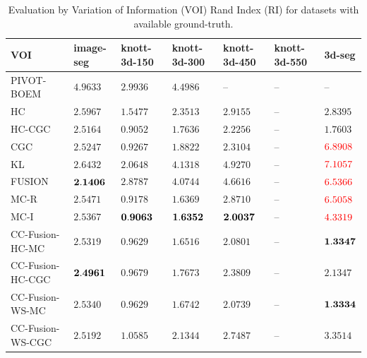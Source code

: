 \documentclass[10pt,twocolumn,letterpaper]{article}
\theoremstyle{definition}
\newcommand{\rd}{\color{red}}
\begin{document}
\begin{table}[t]
   \tiny
   \centering
   \caption{Evaluation by Variation of Information (VOI) Rand Index (RI) for datasets with available ground-truth.}
   \label{tab:eval}
   \begin{tabular}{lllllll}
      \toprule
         VOI              &  image-seg   & knott-3d-150 & knott-3d-300   & knott-3d-450 & knott-3d-550 &3d-seg\\
      \midrule 
         PIVOT-BOEM       &\rd$ 4.9633$  &\rd $ 2.9936$ &\rd $ 4.4986$   &      --      &    --        &  --\\ 
         HC               &   $ 2.5967$  &    $ 1.5477$ &    $ 2.3513$   &    $ 2.9155$ &    --        & $       2.8395$\\
         HC-CGC           &   $ 2.5164$  &    $ 0.9052$ &    $ 1.7636$   &    $ 2.2256$ &    --        & $       1.7603$ \\
         CGC              &   $ 2.5247$  &    $ 0.9267$ &    $ 1.8822$   &    $ 2.3104$ &    --        & $\rd    6.8908$ \\
         KL               &   $ 2.6432$  &\rd $ 2.0648$ &\rd $ 4.1318$   &\rd $ 4.9270$ &    --        & $\rd    7.1057$\\
         FUSION           &$\bf 2.1406$  &\rd $ 2.8787$ &\rd $ 4.0744$   &\rd $ 4.6616$ &    --        & $\rd    6.5366$ \\
         MC-R             &   $ 2.5471$  &    $ 0.9178$ &    $ 1.6369$   &    $ 2.8710$ &    --        & $\rd    6.5058$\\   
         MC-I             &   $ 2.5367$  & $\bf 0.9063$ & $\bf 1.6352$   & $\bf 2.0037$ &    --        & $\rd    4.3319$\\  
         CC-Fusion-HC-MC   &   $ 2.5319$  &    $ 0.9629$ &    $ 1.6516$   &    $ 2.0801$ &    --        & $\bf    1.3347$ \\  
         CC-Fusion-HC-CGC  &$\bf 2.4961$  &    $ 0.9679$ &    $ 1.7673$   &    $ 2.3809$ &    --        & $       2.1347$ \\  
         CC-Fusion-WS-MC   &   $ 2.5340$  &    $ 0.9629$ &    $ 1.6742$   &    $ 2.0739$ &    --        & $\bf    1.3334$ \\  
         CC-Fusion-WS-CGC  &   $ 2.5192$  &    $ 1.0585$ &    $ 2.1344$   &    $ 2.7487$ &    --        & $       3.3514$ \\      
      \bottomrule
   \end{tabular}


\end{table}
\end{document}
